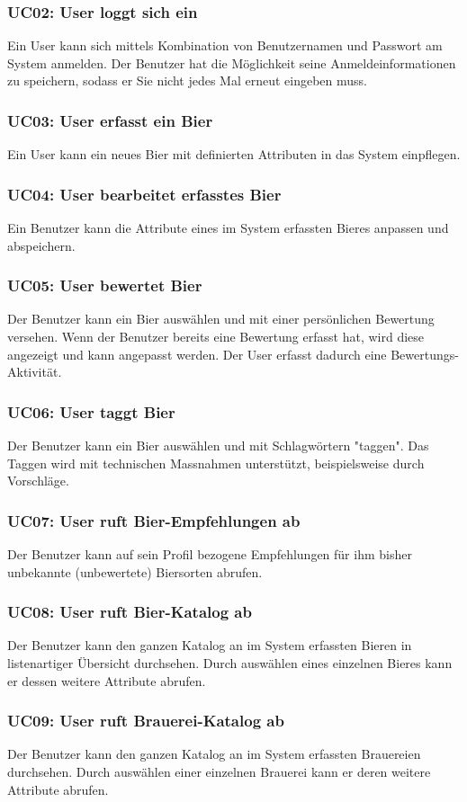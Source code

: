\documentclass[10pt,a4paper]{scrartcl}
\begin{document}
\subsubsection*{UC02: User loggt sich ein}
Ein User kann sich mittels Kombination von Benutzernamen und Passwort am System anmelden.
Der Benutzer hat die Möglichkeit seine Anmeldeinformationen zu speichern, sodass er Sie nicht jedes Mal erneut eingeben muss.
\subsubsection*{UC03: User erfasst ein Bier}
Ein User kann ein neues Bier mit definierten Attributen in das System einpflegen.
\subsubsection*{UC04: User bearbeitet erfasstes Bier}
Ein Benutzer kann die Attribute eines im System erfassten Bieres anpassen und abspeichern.
\subsubsection*{UC05: User bewertet Bier}
Der Benutzer kann ein Bier auswählen und mit einer persönlichen Bewertung versehen. Wenn der Benutzer bereits eine Bewertung erfasst hat, wird diese angezeigt und kann angepasst werden. Der User erfasst dadurch eine Bewertungs-Aktivität.
\subsubsection*{UC06: User taggt Bier}
Der Benutzer kann ein Bier auswählen und mit Schlagwörtern "taggen". Das Taggen wird mit technischen Massnahmen unterstützt, beispielsweise durch Vorschläge.
\subsubsection*{UC07: User ruft Bier-Empfehlungen ab}
Der Benutzer kann auf sein Profil bezogene Empfehlungen für ihm bisher unbekannte (unbewertete) Biersorten abrufen.
\subsubsection*{UC08: User ruft Bier-Katalog ab}
Der Benutzer kann den ganzen Katalog an im System erfassten Bieren in listenartiger Übersicht durchsehen. Durch auswählen eines einzelnen Bieres kann er dessen weitere Attribute abrufen.
\subsubsection*{UC09: User ruft Brauerei-Katalog ab}
Der Benutzer kann den ganzen Katalog an im System erfassten Brauereien durchsehen. Durch auswählen einer einzelnen Brauerei kann er deren weitere Attribute abrufen.
\end{document}
